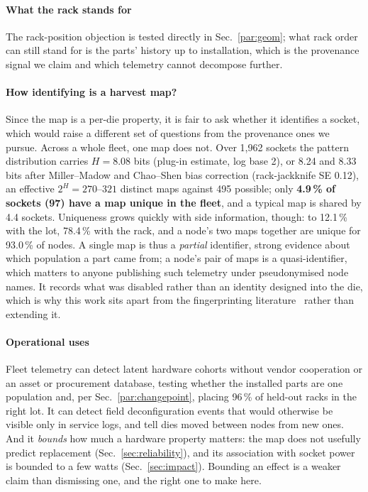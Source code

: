 \documentclass[10pt,conference]{IEEEtran}
\begin{document}
\paragraph*{What the rack stands for} The rack-position objection is tested directly in
Sec.~\ref{par:geom}; what rack order can still stand for is the parts' history up to installation,
which is the provenance signal we claim and which telemetry cannot decompose further.

\paragraph*{How identifying is a harvest map?} Since the map is a per-die property, it is fair to
ask whether it identifies a socket, which would raise a different set of questions from the
provenance ones we pursue. Across a whole fleet, one map does not. Over 1{,}962 sockets the
pattern distribution carries $H=8.08$ bits (plug-in estimate, log base 2), or 8.24 and 8.33 bits
after Miller--Madow and Chao--Shen bias correction (rack-jackknife SE 0.12), an effective
$2^{H}=270$--$321$ distinct maps against 495 possible; only \textbf{4.9\,\% of sockets (97) have a
map unique in the fleet}, and a typical map is shared by 4.4 sockets. Uniqueness grows quickly with
side information, though: to 12.1\,\% with the lot, 78.4\,\% with the rack, and a node's two maps
together are unique for 93.0\,\% of nodes. A single map is thus a \emph{partial} identifier, strong
evidence about which population a part came from; a node's pair of maps is a quasi-identifier, which
matters to anyone publishing such telemetry under pseudonymised node names. It records what was
disabled rather than an identity designed into the die, which is why this work sits apart from the
fingerprinting literature~\cite{jetta2025provenance} rather than extending it.

\paragraph*{Operational uses} Fleet telemetry can detect latent hardware cohorts without vendor
cooperation or an asset or procurement database, testing whether the installed parts are one
population and, per Sec.~\ref{par:changepoint}, placing 96\,\% of held-out racks in the right lot.
It can detect field deconfiguration events that would otherwise be visible only in service logs,
and tell dies moved between nodes from new ones. And it \emph{bounds} how much a hardware property
matters: the map does not usefully predict replacement (Sec.~\ref{sec:reliability}), and its
association with socket power is bounded to a few watts (Sec.~\ref{sec:impact}). Bounding an effect is a weaker claim than dismissing one, and
the right one to make here.
\end{document}
